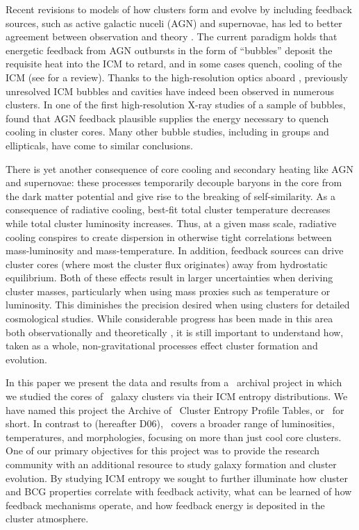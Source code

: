 \documentclass{emulateapj}
\begin{document}
Recent revisions to models of how clusters form and evolve by
including feedback sources, such as active galactic nuceli (AGN) and
supernovae, has led to better agreement between observation and theory
\citep{bower06, croton06, saro06}. The current paradigm holds that
energetic feedback from AGN outbursts in the form of ``bubbles''
deposit the requisite heat into the ICM to retard, and in some cases
quench, cooling of the ICM (see \citealt{mcnamrev} for a
review). Thanks to the high-resolution optics aboard \chandra,
previously unresolved ICM bubbles and cavities have indeed been
observed in numerous clusters. In one of the first high-resolution
X-ray studies of a sample of bubbles, \cite{birzan} found that AGN
feedback plausible supplies the energy necessary to quench cooling in
cluster cores. Many other bubble studies, including in groups and
ellipticals, have come to similar conclusions.

There is yet another consequence of core cooling and secondary heating
like AGN and supernovae: these processes temporarily decouple baryons
in the core from the dark matter potential and give rise to the
breaking of self-similarity. As a consequence of radiative cooling,
best-fit total cluster temperature decreases while total cluster
luminosity increases. Thus, at a given mass scale, radiative cooling
conspires to create dispersion in otherwise tight correlations between
mass-luminosity and mass-temperature. In addition, feedback sources
can drive cluster cores (where most the cluster flux originates) away
from hydrostatic equilibrium. Both of these effects result in larger
uncertainties when deriving cluster masses, particularly when using
mass proxies such as temperature or luminosity. This diminishes the
precision desired when using clusters for detailed cosmological
studies. While considerable progress has been made in this area both
observationally and theoretically \citep{1996ApJ...458...27B,
2005ApJ...624..606J, kravtsov06, nagai07, VV08}, it is still important
to understand how, taken as a whole, non-gravitational processes
effect cluster formation and evolution.

In this paper we present the data and results from a \chandra\
archival project in which we studied the cores of \numcluster\ galaxy
clusters via their ICM entropy distributions. We have named this
project the Archive of \chandra\ Cluster Entropy Profile Tables, or
\accept\ for short. In contrast to \cite{d06} (hereafter D06),
\accept\ covers a broader range of luminosities, temperatures, and
morphologies, focusing on more than just cool core clusters. One of
our primary objectives for this project was to provide the research
community with an additional resource to study galaxy formation and
cluster evolution. By studying ICM entropy we sought to further
illuminate how cluster and BCG properties correlate with feedback
activity, what can be learned of how feedback mechanisms operate, and
how feedback energy is deposited in the cluster atmosphere.
\end{document}
